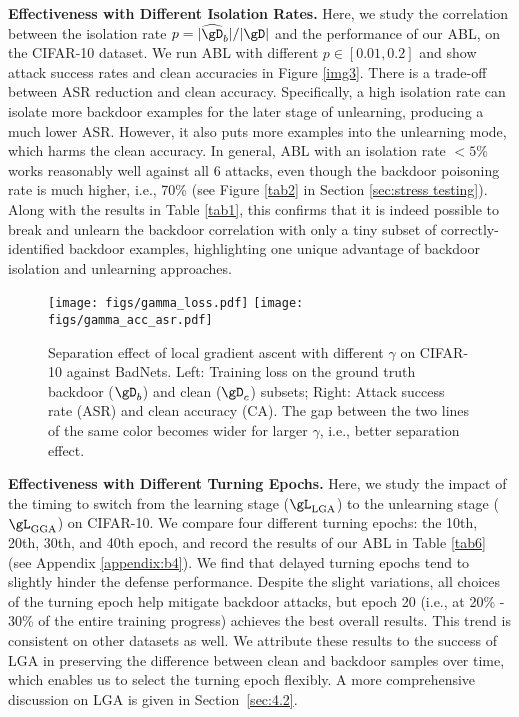 \noindent\textbf{Effectiveness with Different Isolation Rates.} Here, we study the correlation between the isolation rate $p = |\widehat{\gD}_b|/|\gD|$ and the performance of our ABL, on the CIFAR-10 dataset. We run ABL with different $p \in [0.01, 0.2]$ and show attack success rates and clean accuracies in Figure \ref{img3}. There is a trade-off between ASR reduction and clean accuracy. Specifically, a high isolation rate can isolate more backdoor examples for the later stage of unlearning, producing a much lower ASR. However, it also puts more examples into the unlearning mode, which harms the clean accuracy. In general, ABL with an isolation rate $< 5\%$ works reasonably well against all 6 attacks, even though the backdoor poisoning rate is much higher, i.e., 70\% (see Figure \ref{tab2} in Section \ref{sec:stress testing}). Along with the results in Table \ref{tab1}, this confirms that it is indeed possible to break and unlearn the backdoor correlation with only a tiny subset of correctly-identified backdoor examples, highlighting one unique advantage of backdoor isolation and unlearning approaches. 

\begin{figure}[!tp]
	\centering
	\texttt{[image: figs/gamma\_loss.pdf]}
	\texttt{[image: figs/gamma\_acc\_asr.pdf]}
	\vspace{-0.1 in}
	\caption{Separation effect of local gradient ascent with different $\gamma$ on CIFAR-10 against BadNets. Left: Training loss on the ground truth backdoor ($\gD_b$) and clean ($\gD_c$) subsets; Right: Attack success rate (ASR) and clean accuracy (CA). The gap between the two lines of the same color becomes wider for larger $\gamma$, i.e., better separation effect.}
	\label{img4}
	\vspace{-0.2 in}
\end{figure}

\noindent\textbf{Effectiveness with Different Turning Epochs.} 
Here, we study the impact of the timing to switch from the learning stage ($\gL_{\textup{LGA}}$) to the unlearning stage ($\gL_{\textup{GGA}}$) on CIFAR-10. We compare four different turning epochs: the 10th, 20th, 30th, and 40th epoch, and record the results of our ABL in Table \ref{tab6} (see Appendix \ref{appendix:b4}). We find that delayed turning epochs tend to slightly hinder the defense performance. Despite the slight variations, all choices of the turning epoch help mitigate backdoor attacks, but epoch 20 (i.e., at 20\% - 30\% of the entire training progress) achieves the best overall results. This trend is consistent on other datasets as well. We attribute these results to the success of LGA in preserving the difference between clean and backdoor samples over time, which enables us to select the turning epoch flexibly. A more comprehensive discussion on LGA is given in Section~\ref{sec:4.2}.

